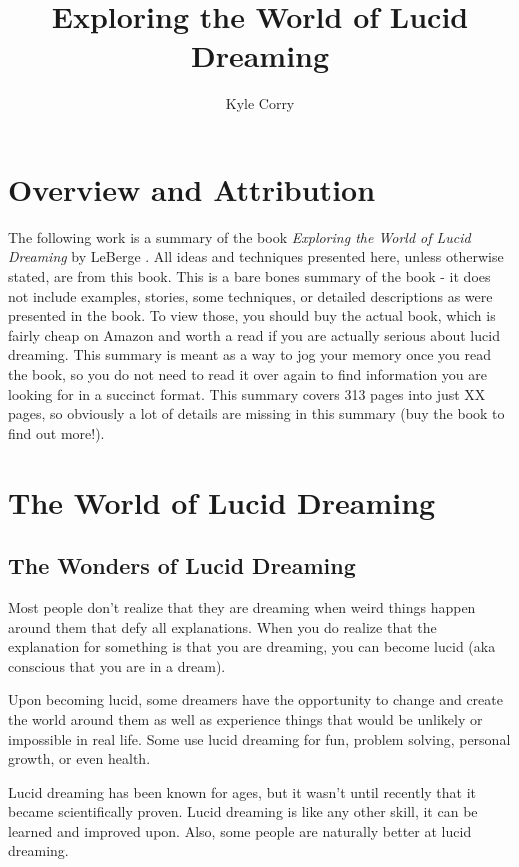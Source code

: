 \documentclass{book}
\title{Exploring the World of Lucid Dreaming}
\author{Kyle Corry}
\begin{document}
\maketitle
\setcounter{tocdepth}{1}

\tableofcontents

\chapter*{Overview and Attribution}
The following work is a summary of the book \textit{Exploring the World of Lucid Dreaming} by LeBerge \cite{leberge}. All ideas and techniques presented here, unless otherwise stated, are from this book. This is a bare bones summary of the book - it does not include examples, stories, some techniques, or detailed descriptions as were presented in the book. To view those, you should buy the actual book, which is fairly cheap on Amazon and worth a read if you are actually serious about lucid dreaming. This summary is meant as a way to jog your memory once you read the book, so you do not need to read it over again to find information you are looking for in a succinct format. This summary covers 313 pages into just XX pages, so obviously a lot of details are missing in this summary (buy the book to find out more!).

\chapter{The World of Lucid Dreaming}
\section{The Wonders of Lucid Dreaming}
Most people don't realize that they are dreaming when weird things happen around them that defy all explanations. When you do realize that the explanation for something is that you are dreaming, you can become lucid (aka conscious that you are in a dream).

Upon becoming lucid, some dreamers have the opportunity to change and create the world around them as well as experience things that would be unlikely or impossible in real life. Some use lucid dreaming for fun, problem solving, personal growth, or even health.

Lucid dreaming has been known for ages, but it wasn't until recently that it became scientifically proven. Lucid dreaming is like any other skill, it can be learned and improved upon. Also, some people are naturally better at lucid dreaming.
\end{document}
